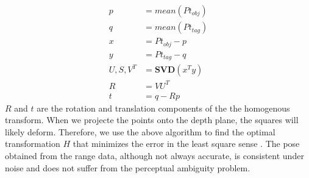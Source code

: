 \begin{align*}
p &= mean(Pt_{obj})\\
q &= mean(Pt_{tag})\\
x &=Pt_{obj} - p\\
y &=Pt_{tag} - q\\
U, S, V^T &= \textbf{SVD}(x^T y)\\
R &= VU^T \\
t &= q-Rp 
\end{align*}
$R$ and $t$ are the rotation and translation components of the the homogenous transform. When we projecte the points onto the depth plane, the squares will likely deform. Therefore, we use the above algorithm to find the optimal transformation $H$ that minimizes the error in the least square sense . 
The pose obtained from the range data, although not always accurate, is consistent under noise and does not suffer from the perceptual ambiguity problem. 
